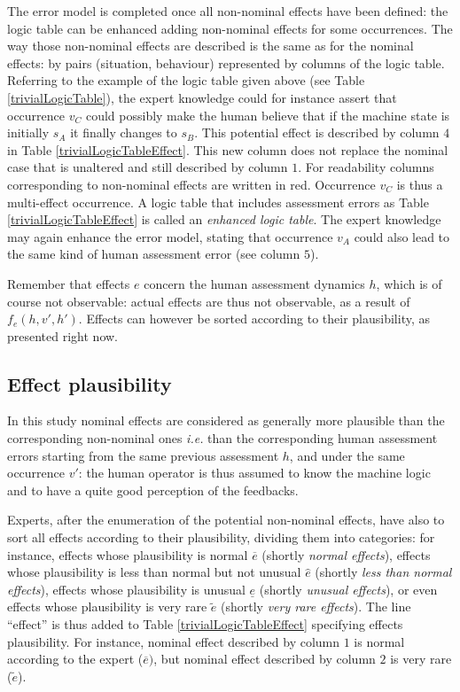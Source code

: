 The error model is completed 
once all non-nominal effects have been defined:
the logic table can be enhanced 
adding non-nominal effects for some occurrences. 
The way those non-nominal effects are described 
is  the same as for the nominal effects: 
by pairs (situation, behaviour) represented by columns of the logic table.
Referring to the example of the logic table given above (see Table \ref{trivialLogicTable}), the expert
knowledge could for instance assert that occurrence $v_C$  could possibly make the human believe that if the machine state is initially $s_A$ it finally changes to $s_B$. 
This potential effect is described by column $4$ in Table \ref{trivialLogicTableEffect}. 
This new column does not replace the nominal case 
that is unaltered and still described by column $1$. 
For readability columns corresponding to non-nominal effects are written in red. Occurrence $v_C$ is thus a multi-effect occurrence. 
A logic table that includes assessment errors as Table \ref{trivialLogicTableEffect} is called an \textit{enhanced logic table}.
The expert knowledge may again enhance the error model,
stating that occurrence $v_A$ could also lead to the same kind of 
human assessment error (see column $5$).

Remember that effects $e$ concern the human assessment dynamics $h$, 
which is of course not observable: actual effects are thus not 
observable, as a result of $f_e(h,v',h')$. Effects can
however be sorted according to their plausibility,
as presented right now.


\subsection{Effect plausibility}
\label{effect_plausibility}
In this study nominal effects are considered 
as generally more plausible than the corresponding non-nominal ones 
\textit{i.e.} than the corresponding human assessment errors
starting from the same previous assessment $h$,
and under the same occurrence $v'$:
the human operator is thus assumed to know the machine logic 
and to have a quite good perception of the feedbacks.

Experts, after the enumeration of the potential non-nominal
effects, have also to sort all effects according to their plausibility, 
dividing them into categories: for instance, effects whose plausibility is normal 
$\overline{e}$ (shortly \textit{normal effects}), effects whose plausibility is less than normal but not unusual $\widehat{e}$ (shortly \textit{less than normal effects}), 
effects whose plausibility is unusual $\underline{e}$ (shortly \textit{unusual effects}), or even effects whose plausibility is very rare $\tilde{e}$ (shortly \textit{very rare effects}). 
The line ``effect'' is thus added to Table \ref{trivialLogicTableEffect} 
specifying effects plausibility. For instance, nominal effect described by
column $1$ is normal according to the expert ($\overline{e})$,
but nominal effect described by column $2$ is very rare ($\tilde{e}$).

